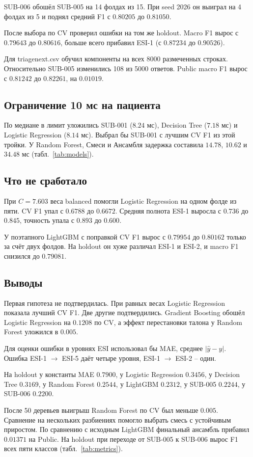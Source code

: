 \documentclass[11pt,a4paper,twocolumn]{article}
\newcommand{\f}[1]{{\ttfamily\def\_{\textunderscore\allowbreak}#1}}
\begin{document}
SUB-006 обошёл SUB-005 на 14 фолдах из 15. При seed 2026 он выиграл на 4 фолдах из 5 и поднял средний F1 с $0.80205$ до $0.81050$.

После выбора по CV проверил ошибки на том же holdout. Macro F1 вырос с $0.79643$ до $0.80616$, больше всего прибавил ESI-1 (с $0.87234$ до $0.90526$).

Для \f{triage\_next.csv} обучил компоненты на всех 8000 размеченных строках. Относительно SUB-005 изменились 108 из 5000 ответов. Public macro F1 вырос с $0.81242$ до $\mathbf{0.82261}$, на $0.01019$.

\subsection{Ограничение 10 мс на пациента}

По медиане в лимит уложились SUB-001 ($8.24$ мс), Decision Tree ($7.18$ мс) и Logistic Regression ($8.14$ мс). Выбрал бы SUB-001 с лучшим CV F1 из этой тройки. У Random Forest, Смеси и Ансамбля задержка составила $14.78$, $10.62$ и $34.48$ мс (табл.~\ref{tab:models}).

\newpage
\subsection{Что не сработало}

При $C=7.603$ веса \f{balanced} помогли Logistic Regression на одном фолде из пяти. CV F1 упал с $0.6788$ до $0.6672$. Средняя полнота ESI-1 выросла с $0.736$ до $0.845$, точность упала с $0.893$ до $0.600$.

У поэтапного LightGBM с поправкой CV F1 вырос с $0.79954$ до $0.80162$ только за счёт двух фолдов. На holdout он хуже различал ESI-1 и ESI-2, и macro F1 снизился до $0.79081$.

\subsection{Выводы}

Первая гипотеза не подтвердилась. При равных весах Logistic Regression показала лучший CV F1. Две другие подтвердились. Gradient Boosting обошёл Logistic Regression на $0.1208$ по CV, а эффект перестановки талона у Random Forest уложился в $0.005$.

Для оценки ошибки в уровнях ESI использовал бы MAE, среднее $|\hat y-y|$. Ошибка ESI-1 $\to$ ESI-5 даёт четыре уровня, ESI-1 $\to$ ESI-2 – один.

На holdout у константы MAE $0.7900$, у Logistic Regression $0.3456$, у Decision Tree $0.3169$, у Random Forest $0.2544$, у LightGBM $0.2312$, у SUB-005 $0.2244$, у SUB-006 $0.2200$.

После 50 деревьев выигрыш Random Forest по CV был меньше $0.005$. Сравнение на нескольких разбиениях помогло выбрать смесь с устойчивым приростом. По сравнению с исходным LightGBM финальный ансамбль прибавил $0.01371$ на Public. На holdout при переходе от SUB-005 к SUB-006 вырос F1 всех пяти классов (табл.~\ref{tab:metrics}).
\end{document}

